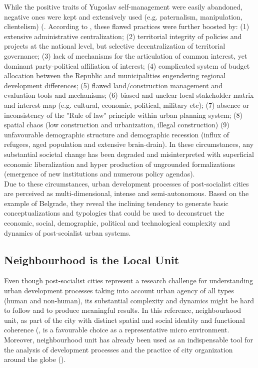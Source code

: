 \documentclass[11pt]{report}
\begin{document}
While the positive traits of Yugoslav self-management were easily abandoned, negative ones were kept and extensively used (e.g. paternalism, manipulation, clientelism) (\citealt{Vujosevic and Maricic 2012}.
According to \href{Vujosevic}{\cite{Vujosevic 2015 Regionalizam u Srbiji 2}}, these flawed practices were further boosted by:
(1) extensive administrative centralization;
(2) territorial integrity of policies and projects at the national level, but selective decentralization of territorial governance;
(3) lack of mechanisms for the articulation of common interest, yet dominant party-political affiliation of interest;
(4) complicated system of budget allocation between the Republic and municipalities engendering regional development differences;
(5) flawed land/construction management and evaluation tools and mechanisms;
(6) biased and unclear local stakeholder matrix and interest map (e.g. cultural, economic, political, military etc);
(7) absence or inconsistency of the "Rule of law" principle within urban planning system;
(8) spatial chaos (low construction and urbanization, illegal construction)
(9) unfavourable demographic structure and demographic recession (influx of refugees, aged population and extensive brain-drain).
In these circumstances, any substantial societal change has been  degraded  and  misinterpreted  with  superficial  economic  liberalization  and  hyper  production  of ungrounded formalizations (emergence of new institutions and numerous policy agendas). 
\\

Due to these circumstances, urban development processes of post-socialist cities are perceived as multi-dimensional, intense and semi-autonomous.
Based on the example of Belgrade, they reveal the inclining tendency to generate basic conceptualizations and typologies that could be used to deconstruct the economic, social, demographic, political and technological complexity and dynamics of post-scoialist urban systems.
  
\subsection{Neighbourhood is the Local Unit}

Even though post-socialist cities represent a research challenge for understanding urban development processes taking into account urban agency of all types (human and non-human), its substantial complexity and dynamics might be hard to follow and to produce meaningful results.
In this reference, neighbourhood unit, as part of the city with distinct spatial and social identity and functional coherence (\href{Merlin}{\citealt{Merlin et Cloay 2009}}, is a favourable choice as a representative micro environment.
Moreover, neighbourhood unit has already been used as an indispensable tool for the analysis of development processes and the practice of city organization around the globe (\citealt{Meenakshi}).
\\
\end{document}
